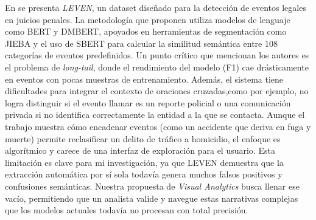 En \cite{yao2022leven} se presenta \textit{LEVEN}, un dataset diseñado para la detección de eventos legales en juicios penales. La metodología que proponen utiliza modelos de lenguaje como \acs{BERT} y DMBERT, apoyados en herramientas de segmentación como JIEBA y el uso de \ac{SBERT} para calcular la similitud semántica entre 108 categorías de eventos predefinidos. Un punto crítico que mencionan los autores es el problema de \textit{long-tail}, donde el rendimiento del modelo (F1) cae drásticamente en eventos con pocas muestras de entrenamiento. Además, el sistema tiene dificultades para integrar el contexto de oraciones cruzadas,como por ejemplo, no logra distinguir si el evento llamar es un reporte policial o una comunicación privada si no identifica correctamente la entidad a la que se contacta. Aunque el trabajo muestra cómo encadenar eventos (como un accidente que deriva en fuga y muerte) permite reclasificar un delito de tráfico a homicidio, el enfoque es algorítmico y carece de una interfaz de exploración para el usuario. Esta limitación es clave para mi investigación, ya que LEVEN demuestra que la extracción automática por sí sola todavía genera muchos falsos positivos y confusiones semánticas. Nuestra propuesta de \textit{Visual Analytics} busca llenar ese vacío, permitiendo que un analista valide y navegue estas narrativas complejas que los modelos actuales todavía no procesan con total precisión.










